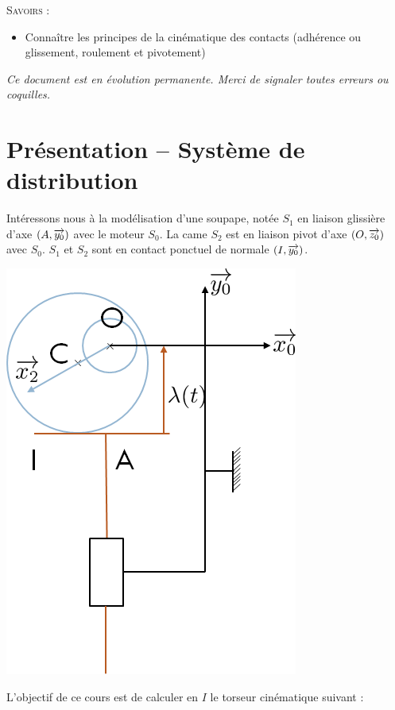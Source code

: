 \documentclass[11pt,oneside]{article}
\begin{document}
\begin{savoir}
\textsc{Savoirs :}
\begin{itemize}
\item Connaître les principes de la cinématique des contacts (adhérence ou glissement, roulement et pivotement)
\end{itemize}
\end{savoir}

\setlength{\parskip}{0ex plus 0.2ex minus 0ex}
 \renewcommand{\contentsname}{}
 \renewcommand{\baselinestretch}{1}

\tableofcontents

 \renewcommand{\baselinestretch}{1.2}
\setlength{\parskip}{2ex plus 0.5ex minus 0.2ex}

\textit{Ce document est en évolution permanente. Merci de signaler toutes
erreurs ou coquilles.}


\section{Présentation -- Système de distribution}

\begin{minipage}[c]{.65\linewidth}
Intéressons nous à la modélisation d'une soupape, notée $S_1$ en liaison glissière d'axe $(A,\overrightarrow{y_0})$ avec le moteur $S_0$. La came $S_2$ est en liaison pivot d'axe $(O,\overrightarrow{z_0})$ avec $S_0$.  $S_1$ et $S_2$ sont en contact ponctuel de normale $(I,\overrightarrow{y_0})$.
\end{minipage}
\begin{minipage}[c]{.3\linewidth}
\begin{center}
\includegraphics[width=.8\textwidth]{png/fig2} 
\end{center}
\end{minipage}
L'objectif de ce cours est de calculer en $I$ le torseur cinématique suivant :
\end{document}
